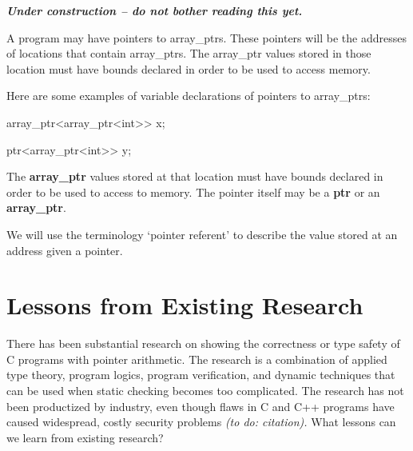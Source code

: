 \documentclass[]{article}
\begin{document}
\emph{\textbf{Under construction -- do not bother reading this yet.}}

A program may have pointers to array\_ptrs. These pointers will be the
addresses of locations that contain array\_ptrs. The array\_ptr values
stored in those location must have bounds declared in order to be used
to access memory.

Here are some examples of variable declarations of pointers to
array\_ptrs:

array\_ptr\textless{}array\_ptr\textless{}int\textgreater{}\textgreater{}
x;

ptr\textless{}array\_ptr\textless{}int\textgreater{}\textgreater{} y;

The \textbf{array\_ptr} values stored at that location must have bounds
declared in order to be used to access to memory. The pointer itself may
be a \textbf{ptr} or an \textbf{array\_ptr}.

We will use the terminology `pointer referent' to describe the value
stored at an address given a pointer.

\section{\texorpdfstring{\protect\hypertarget{ux5fRef416271163}{}{\protect\hypertarget{ux5fToc420589166}{}{\protect\hypertarget{ux5fToc422906947}{}{\protect\hypertarget{ux5fToc424307670}{}{\protect\hypertarget{ux5fToc426641126}{}{\protect\hypertarget{ux5fToc435435001}{}{\protect\hypertarget{ux5fToc437460834}{}{\protect\hypertarget{ux5fToc440445515}{}{\protect\hypertarget{ux5fToc440449297}{}{\protect\hypertarget{ux5fToc440551947}{}{\protect\hypertarget{ux5fToc422907003}{}{\protect\hypertarget{ux5fToc424307732}{}{\protect\hypertarget{ux5fToc420589212}{}{\protect\hypertarget{ux5fRef416274081}{}{}}}}}}}}}}}}}}Lessons
from Existing
Research}{Lessons from Existing Research}}\label{lessons-from-existing-research}

There has been substantial research on showing the correctness or type
safety of C programs with pointer arithmetic. The research is a
combination of applied type theory, program logics, program
verification, and dynamic techniques that can be used when static
checking becomes too complicated. The research has not been productized
by industry, even though flaws in C and C++ programs have caused
widespread, costly security problems \emph{(to do: citation).} What
lessons can we learn from existing research?
\end{document}
